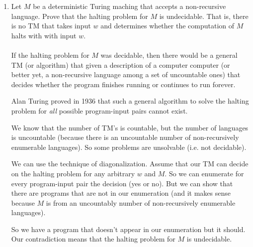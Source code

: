 \documentclass[10pt,a4paper,final]{article}
\begin{document}
\begin{enumerate}
\item %
Let $M$ be a deterministic Turing maching that accepts a non-recursive language.
Prove that the halting problem for $M$ is undecidable.
That is, there is no TM that takes input $w$ and determines whether the computation of $M$ halts with
with input $w$. \\
\\
If the halting problem for $M$ was decidable, then there would be a general TM (or algorithm)
that given a description of a computer computer (or better yet, a non-recursive language among a set
of uncountable ones) that decides whether the program finishes running or continues to run forever.

Alan Turing proved in 1936 that such a general algorithm to solve the halting problem for \emph{all}
possible program-input pairs cannot exist.

We know that the number of TM's is countable, but the number of languages is uncountable
(because there is an uncountable number of non-recursively enumerable languages). So
some problems are unsolvable (i.e. not decidable).

We can use the technique of diagonalization. Assume that our TM can decide on the halting problem
for any arbitrary $w$ and $M$. So we can enumerate for every program-input pair the decision (yes or no). But we can show that there are programs that are not in our enumeration (and it makes sense because
$M$ is from an uncountably number of non-recursively enumerable languages).

So we have a program that doesn't appear in our enumeration but it should. Our contradiction means
that the halting problem for $M$ is undecidable.
\end{enumerate}
\end{document}
